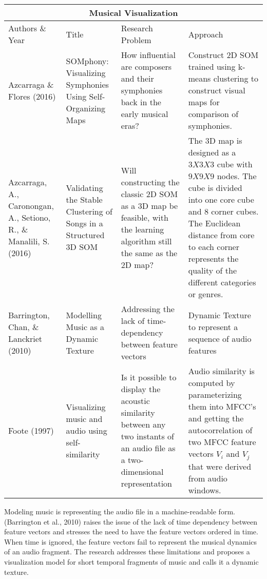 \begin{center}
\begin{tabular}{ |p{3cm}|p{3cm}|p{3cm}|p{3cm}| }
 \hline
 \multicolumn{4}{|c|}{Musical Visualization} \\
 \hline
 Authors \& Year&Title&Research Problem&Approach\\
 \hline
 Azcarraga \& Flores (2016)& SOMphony: Visualizing Symphonies Using Self-Organizing Maps & How influential are composers and their symphonies back in the early musical eras? & Construct 2D SOM trained using k-means clustering to construct visual maps for comparison of symphonies.\\
\hline
 Azcarraga, A., Caronongan, A., Setiono, R., \& Manalili, S. (2016) & Validating the Stable Clustering of Songs in a Structured 3D SOM & Will constructing the classic 2D SOM as a 3D map be feasible, with the learning algorithm still the same as the 2D map? & The 3D map is designed as a $3X3X3$ cube with $9X9X9$ nodes. The cube is divided into one core cube and 8 corner cubes. The Euclidean distance from core to each corner represents the quality of the different categories or genres. \\
\hline
Barrington, Chan, \& Lanckriet (2010) & Modelling Music as a Dynamic Texture &Addressing the lack of time-dependency between feature vectors & Dynamic Texture to represent a sequence of audio features \\
\hline
 Foote (1997) & Visualizing music and audio using self-similarity & Is it possible to display the acoustic similarity between any two instants of an audio file as a two-dimensional representation & Audio similarity is computed by parameterizing them into MFCC’s and getting the autocorrelation of two MFCC feature vectors $V_i$ and $V_j$ that were derived from audio windows. \\
 \hline
\end{tabular}
\end{center}

Modeling music is representing the audio file in a machine-readable form. (Barrington et al., 2010) raises the issue of the lack of time dependency between feature vectors and stresses the need to have the feature vectors ordered in time. When time is ignored, the feature vectors fail to represent the musical dynamics of an audio fragment. The research addresses these limitations and proposes a visualization model for short temporal fragments of music and calls it a dynamic texture.

